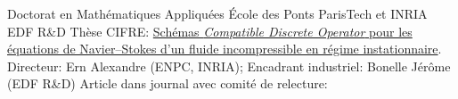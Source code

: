 \documentclass[french]{RMcv}
\begin{document}





%
%


%
        {Doctorat en Math\'ematiques Appliqu\'ees}%
        {\'Ecole des Ponts ParisTech et INRIA EDF R\&D}%
        {Th\`ese CIFRE: \href{\PhDlink}{Sch\'emas \emph{Compatible Discrete Operator} pour les \'equations de Navier–Stokes d’un fluide incompressible en r\'egime instationnaire}. Directeur: Ern Alexandre (ENPC, INRIA); Encadrant industriel: Bonelle J\'er\^ome (EDF R\&D)}%
        {Article dans journal avec comit\'e de relecture: \articlehref{}}

\end{document}
